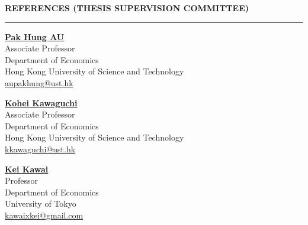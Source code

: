 \documentclass[11pt,letterpaper]{article}
\newcommand{\sectionheader}[1]{%
  \vspace{0.45em}
  {\large\bfseries #1}\\[-0.15em]
  \rule{\textwidth}{0.4pt}\par
  \vspace{0.2em}
}
\begin{document}
\sectionheader{REFERENCES (THESIS SUPERVISION COMMITTEE)}
{
\noindent
\begin{minipage}[t]{0.48\textwidth}
\textbf{\href{https://aupakhung.weebly.com/}{Pak Hung AU}}\\
Associate Professor\\
Department of Economics\\
Hong Kong University of Science and Technology\\
\href{mailto:aupakhung@ust.hk}{aupakhung@ust.hk}
\end{minipage}\hfill
\begin{minipage}[t]{0.48\textwidth}
\textbf{\href{https://www.kohei-kawaguchi.com/}{Kohei Kawaguchi}}\\
Associate Professor\\
Department of Economics\\
Hong Kong University of Science and Technology\\
\href{mailto:kkawaguchi@ust.hk}{kkawaguchi@ust.hk}
\end{minipage}

\vspace{1.0em}
\noindent
\begin{minipage}[t]{0.48\textwidth}
\textbf{\href{https://www.e.u-tokyo.ac.jp/fservice/faculty/kawai/kawai-e/kawai01-e.html}{Kei Kawai}}\\
Professor\\
Department of Economics\\
University of Tokyo\\
\href{mailto:kawaixkei@gmail.com}{kawaixkei@gmail.com}
\end{minipage}
}
\end{document}
